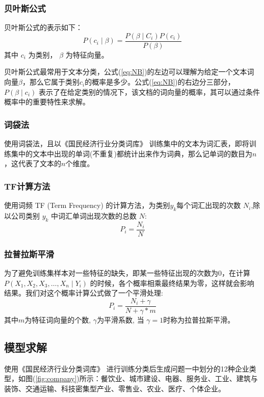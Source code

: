 \documentclass[withoutpreface,bwprint]{cumcmthesis} %
\begin{document}
\subsubsection{贝叶斯公式}
贝叶斯公式的表示如下：
\begin{equation}\label{eq:NB}
	P(c_i \mid \beta)=\frac{P(\beta \mid C_i) P(c_i)}{P(\beta)}
\end{equation}
其中 $c_{i}$ 为类别， $\beta$ 为特征向量。

贝叶斯公式最常用于文本分类，公式(\ref{eq:NB})的左边可以理解为给定一个文本词向量$\beta$，那么它属于类别$c_i$的概率是多少。公式(\ref{eq:NB})的右边分三部分， $P(\beta \mid c_i)$ 表示了在给定类别的情况下，该文档的词向量的概率，其可以通过条件概率中的重要特性来求解。

\subsubsection{词袋法}
使用词袋法，且以《国民经济行业分类词库》 \cite{guominjingji} 训练集中的文本为词汇表，即将训练集中的文本中出现的单词(不重复)都统计出来作为词典，那么记单词的数目为$n$，这代表了文本的$n$个维度。

\subsubsection{TF计算方法}
使用词频 TF (Term Frequency) 的计算方法，为类别$y_k$每个词汇出现的次数 $N_{i}$,除以公司类别 $y_k$ 中词汇单词出现次数的总数 $N$:
\begin{equation}
P_{i}=\frac{N_{i}}{N}
\end{equation}

\subsubsection{拉普拉斯平滑}
为了避免训练集样本对一些特征的缺失，即某一些特征出现的次数为0，在计算 $P\left(X_{1}, X_{2}, X_{3}, \ldots, X_{n} \mid Y_{i}\right)$ 的时候，各个概率相乘最终结果为零，这样就会影响结果。我们对这个概率计算公式做了一个平滑处理:
\begin{equation}
P_{i}=\frac{N_{i}+\gamma}{N+\gamma * m}
\end{equation}
其中$m$为特征词向量的个数, $\gamma$为平滑系数, 当 $\gamma=1$时称为拉普拉斯平滑。


\subsection{模型求解}
使用《国民经济行业分类词库》 \cite{guominjingji} 进行训练分类后生成问题一中划分的12种企业类型，如图(\ref{fig:company})所示：餐饮业、城市建设、电器、服务业、工业、建筑与装饰、交通运输、科技密集型产业、零售业、农业、医疗、个体企业。
\end{document}
